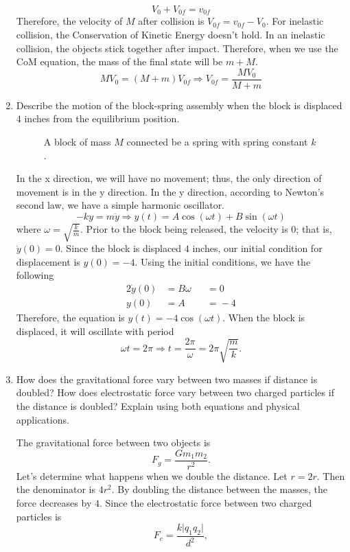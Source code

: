 \begin{enumerate}
\[  V_0 + V_{0f} = v_{0f}
  \]
  Therefore, the velocity of \(M\) after collision is \(V_{0f} = v_{0f} - V_0\).
  For inelastic collision, the Conservation of Kinetic Energy doesn't hold.
  In an inelastic collision, the objects stick together after impact.
  Therefore, when we use the CoM equation, the mass of the final state will be
  \(m + M\).
  \[
  MV_0 = (M + m)V_{0f}\Rightarrow V_{0f} = \frac{MV_0}{M + m}
  \]
\item
  Describe the motion of the block-spring assembly when the block is displaced
  \(4\) inches from the equilibrium position.
  \begin{figure}[H]
    \centering
    
    \caption{A block of mass \(M\) connected be a spring with spring constant
      \(k\).}
  \end{figure}
  In the x direction, we will have no movement; thus, the only direction of
  movement is in the y direction.
  In the y direction, according to Newton's second law, we have a simple harmonic
  oscillator.
  \[
  -ky = m\ddot{y}\Rightarrow y(t) = A\cos(\omega t) + B\sin(\omega t)
  \]
  where \(\omega = \sqrt{\frac{k}{m}}\).
  Prior to the block being released, the velocity is \(0\); that is,
  \(\dot{y}(0) = 0\).
  Since the block is displaced \(4\) inches, our initial condition for
  displacement is \(y(0) = -4\).
  Using the initial conditions, we have the following
  \begin{alignat*}{2}
    \dot{y}(0) &= B\omega && = {} 0\\
    y(0) &= A && = {} -4
  \end{alignat*}
  Therefore, the equation is \(y(t) = -4\cos(\omega t)\).
  When the block is displaced, it will oscillate with period
  \[
  \omega t = 2\pi\Rightarrow t = \frac{2\pi}{\omega} = 2\pi\sqrt{\frac{m}{k}}.
  \]
\item
  How does the gravitational force vary between two masses if distance is 
  doubled?
  How does electrostatic force vary between two charged particles if the
  distance is doubled?
  Explain using both equations and physical applications.
  \par\smallskip
  The gravitational force between two objects is
  \[
  F_g = \frac{Gm_1m_2}{r^2}.
  \]
  Let's determine what happens when we double the distance.
  Let \(r = 2r\).
  Then the denominator is \(4r^2\).
  By doubling the distance between the masses, the force decreases by \(4\).
  Since the electrostatic force between two charged particles is
  \[
  F_e = \frac{k\lvert q_1q_2\rvert}{d^2},
\]
\end{enumerate}
